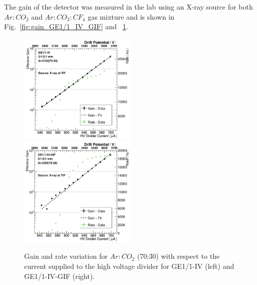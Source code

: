 The gain of the detector was measured in the lab using an X-ray source for both $Ar:CO_2$ and $Ar:CO_2:CF_4$ gas mixture and is shown in Fig.~\ref{fig:gain_GE1/1_IV_GIF} and ~\ref{fig:gain_GE1/1_IV}.
\begin{figure}[htbp]
    \centering
    \includegraphics[width=0.5\textwidth]{figures/GEM/Gain_curve_GE11_IV_Ar_CO2.jpeg}%
    \includegraphics[width=0.5\textwidth]{figures/GEM/Gain_curve_GE11_IV_GIF_Ar_CO2.jpeg}
    \caption{Gain and rate variation for $Ar:CO_2$ (70:30) with respect to the current supplied to the high voltage divider for GE1/1-IV (left) and GE1/1-IV-GIF (right).}
    \label{fig:gain_GE1/1_IV}
\end{figure}
